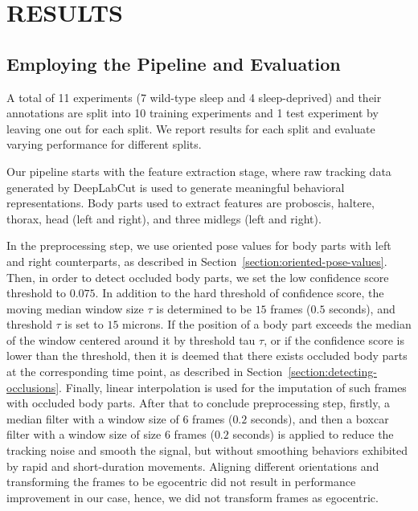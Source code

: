 \setlength{\parindent}{0pt}
\chapter{\bf RESULTS}\label{chapter:results}
\section{Employing the Pipeline and  Evaluation}\label{section:employing-proposed-pipeline}
A total of 11 experiments (7 wild-type sleep and 4 sleep-deprived) and their annotations are split into 10 training experiments and 1 test experiment by leaving one out for each split.
We report results for each split and evaluate varying performance for different splits.

Our pipeline starts with the feature extraction stage, where raw tracking data generated by DeepLabCut is used to generate meaningful behavioral representations.
Body parts used to extract features are proboscis, haltere, thorax, head (left and right), and three midlegs (left and right).

In the preprocessing step, we use oriented pose values for body parts with left and right counterparts, as described in Section~\ref{section:oriented-pose-values}.
Then, in order to detect occluded body parts, we set the low confidence score threshold to $0.075$.
In addition to the hard threshold of confidence score, the moving median window size $\tau$ is determined to be $15$ frames ($0.5$ seconds), and threshold $\tau$ is set to $15$ microns.
If the position of a body part exceeds the median of the window centered around it by threshold tau $\tau$, or if the confidence score is lower than the threshold, then it is deemed that there exists occluded body parts at the corresponding time point, as described in Section~\ref{section:detecting-occlusions}.
Finally, linear interpolation is used for the imputation of such frames with occluded body parts.
After that to conclude preprocessing step, firstly, a median filter with a window size of $6$ frames ($0.2$ seconds), and then a boxcar filter with a window size of size $6$ frames ($0.2$ seconds) is applied to reduce the tracking noise and smooth the signal, but without smoothing behaviors exhibited by rapid and short-duration movements.
Aligning different orientations and transforming the frames to be egocentric did not result in performance improvement in our case, hence, we did not transform frames as egocentric.

